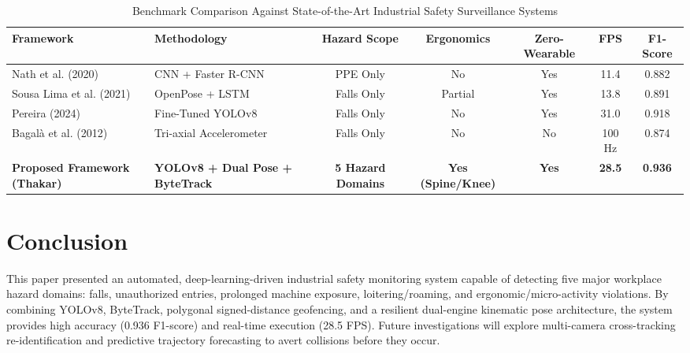 \documentclass[conference]{IEEEtran}
\begin{document}
\begin{table}[htbp]
\caption{Benchmark Comparison Against State-of-the-Art Industrial Safety Surveillance Systems}
\begin{center}
\begin{tabular}{llccccc}
\toprule
\textbf{Framework} & \textbf{Methodology} & \textbf{Hazard Scope} & \textbf{Ergonomics} & \textbf{Zero-Wearable} & \textbf{FPS} & \textbf{F1-Score} \\
\midrule
Nath et al. (2020) \cite{nath2021} & CNN + Faster R-CNN & PPE Only & No & Yes & 11.4 & 0.882 \\
Sousa Lima et al. (2021) \cite{lima2021} & OpenPose + LSTM & Falls Only & Partial & Yes & 13.8 & 0.891 \\
Pereira (2024) \cite{pereira2024} & Fine-Tuned YOLOv8 & Falls Only & No & Yes & 31.0 & 0.918 \\
Bagal\`{a} et al. (2012) \cite{bagala2012} & Tri-axial Accelerometer & Falls Only & No & No & 100 Hz & 0.874 \\
\textbf{Proposed Framework (Thakar)} & \textbf{YOLOv8 + Dual Pose + ByteTrack} & \textbf{5 Hazard Domains} & \textbf{Yes (Spine/Knee)} & \textbf{Yes} & \textbf{28.5} & \textbf{0.936} \\
\bottomrule
\end{tabular}
\label{tab:sota}
\end{center}
\end{table}

\section{Conclusion}
This paper presented an automated, deep-learning-driven industrial safety monitoring system capable of detecting five major workplace hazard domains: falls, unauthorized entries, prolonged machine exposure, loitering/roaming, and ergonomic/micro-activity violations. By combining YOLOv8, ByteTrack, polygonal signed-distance geofencing, and a resilient dual-engine kinematic pose architecture, the system provides high accuracy (0.936 F1-score) and real-time execution (28.5 FPS). Future investigations will explore multi-camera cross-tracking re-identification and predictive trajectory forecasting to avert collisions before they occur.
\end{document}

